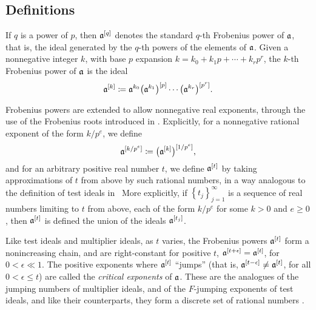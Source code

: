 \documentclass[11pt]{amsart}
\begin{document}
\subsection{Definitions}

{

If $q$ is a power of $p$, then $\mathfrak{a}^{[q]}$ denotes the standard $q$-th Frobenius power of $\mathfrak{a}$, that is, the ideal generated by the $q$-th powers of the elements of $\mathfrak{a}$.
Given a nonnegative integer $k$, with base $p$ expansion $k = k_0 + k_1 p + \cdots + k_r p^r$, the $k$-th Frobenius power of $\mathfrak{a}$ is the ideal
\[\mathfrak{a}^{[k]} \coloneqq \mathfrak{a}^{k_0}\big(\mathfrak{a}^{k_1}\big)^{[p]}\cdots \big(\mathfrak{a}^{k_r}\big)^{[p^r]}.\]




Frobenius powers are extended to allow nonnegative real exponents, through the use of the Frobenius roots introduced in \cite{blickle+mustata+smith.discr_rat_FPTs}.
Explicitly, for a nonnegative rational exponent of the form $k/p^e$, we define
\[\mathfrak{a}^{[k/p^e]} \coloneqq \big(\mathfrak{a}^{[k]}\big)^{[1/p^e]},\]
and for an arbitrary positive real number $t$, we define $\mathfrak{a}^{[t]}$ by taking approximations of $t$ from above by such rational numbers, in a way analogous to the definition of test ideals in \loccit\
More explicitly, if $\left\{t_j\right\}_{j=1}^\infty$ is a sequence of real numbers limiting to $t$ from above, each of the form $k/p^e$ for some $k>0$ and $e \geq 0$, then $\mathfrak{a}^{[t]}$ is defined the union of the ideals $\mathfrak{a}^{[t_j]}$.

Like test ideals and multiplier ideals, as $t$ varies, the Frobenius powers $\mathfrak{a}^{[t]}$ form a nonincreasing chain, and are right-constant for positive $t$, \ie $\mathfrak{a}^{[t+\epsilon]} = \mathfrak{a}^{[t]}$, for $0<\epsilon \ll 1$.
The positive exponents where $\mathfrak{a}^{[t]}$ ``jumps'' (that is, $\mathfrak{a}^{[t-\epsilon]}\ne \mathfrak{a}^{[t]}$, for all $0<\epsilon \le t$) are called the \emph{critical exponents} of $\mathfrak{a}$.
These are the analogues of the jumping numbers of multiplier ideals, and of the $F$-jumping exponents of test ideals, and like their counterparts, they form a discrete set of rational numbers \cite[Corollary~5.8]{hernandez+etal.frobenius_powers}.

}
\end{document}
